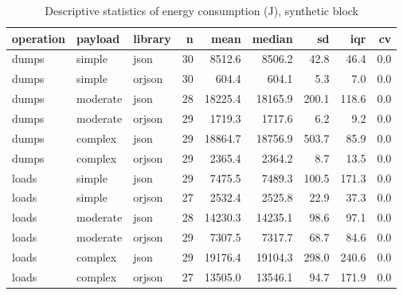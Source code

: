 \begin{table}[ht]
\centering
\begin{tabular}{lllrrrrrr}
  \toprule
operation & payload & library & n & mean & median & sd & iqr & cv \\ 
  \midrule
dumps & simple & json & 30 & 8512.6 & 8506.2 & 42.8 & 46.4 & 0.0 \\ 
  dumps & simple & orjson & 30 & 604.4 & 604.1 & 5.3 & 7.0 & 0.0 \\ 
  dumps & moderate & json & 28 & 18225.4 & 18165.9 & 200.1 & 118.6 & 0.0 \\ 
  dumps & moderate & orjson & 29 & 1719.3 & 1717.6 & 6.2 & 9.2 & 0.0 \\ 
  dumps & complex & json & 29 & 18864.7 & 18756.9 & 503.7 & 85.9 & 0.0 \\ 
  dumps & complex & orjson & 29 & 2365.4 & 2364.2 & 8.7 & 13.5 & 0.0 \\ 
  loads & simple & json & 29 & 7475.5 & 7489.3 & 100.5 & 171.3 & 0.0 \\ 
  loads & simple & orjson & 27 & 2532.4 & 2525.8 & 22.9 & 37.3 & 0.0 \\ 
  loads & moderate & json & 28 & 14230.3 & 14235.1 & 98.6 & 97.1 & 0.0 \\ 
  loads & moderate & orjson & 29 & 7307.5 & 7317.7 & 68.7 & 84.6 & 0.0 \\ 
  loads & complex & json & 29 & 19176.4 & 19104.3 & 298.0 & 240.6 & 0.0 \\ 
  loads & complex & orjson & 27 & 13505.0 & 13546.1 & 94.7 & 171.9 & 0.0 \\ 
   \bottomrule
\end{tabular}
\caption{Descriptive statistics of energy consumption (J), synthetic block} 
\label{tab:desc_energy}
\end{table}

